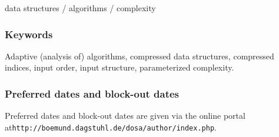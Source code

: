 \documentclass[a4paper,10pt]{article}
\begin{document}
    data structures / algorithms / complexity



\subsubsection*{Keywords}



Adaptive (analysis of) algorithms, 
compressed data structures, 
compressed indices,
input order,
input structure,
parameterized complexity.


\subsubsection*{Preferred dates and block-out dates}

Preferred dates and block-out dates are given via the online portal at\newline \texttt{http://boemund.dagstuhl.de/dosa/author/index.php}.
\end{document}
